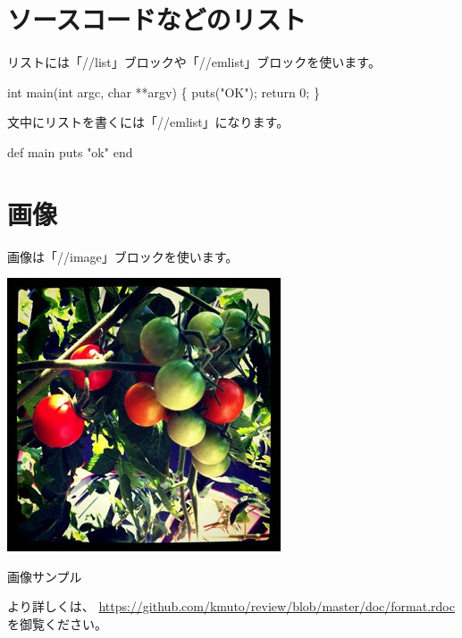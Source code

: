 \section{ソースコードなどのリスト}
\label{sec:1-3}

リストには「//list」ブロックや「//emlist」ブロックを使います。

\begin{reviewlist}
int main(int argc, char **argv) \{
  puts("OK");
  return 0;
\}
\end{reviewlist}

文中にリストを書くには「//emlist」になります。

\begin{reviewemlist}
def main
  puts "ok"
end
\end{reviewemlist}

\section{画像}
\label{sec:1-4}

画像は「//image」ブロックを使います。

\begin{reviewimage}
\includegraphics[width=\maxwidth]{./images/ch01-imgsample.jpg}
\caption{画像サンプル}
\label{image:ch01:imgsample}
\end{reviewimage}

より詳しくは、
\url{https://github.com/kmuto/review/blob/master/doc/format.rdoc}
を御覧ください。
